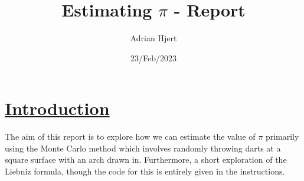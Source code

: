 \documentclass[a4paper,11pt]{article}
\begin{document}
\title{
	\textbf{Estimating $\pi$ - Report}
}
\date{23/Feb/2023}
\author{Adrian Hjert}

\maketitle

\section*{
	\underline{Introduction}
}
The aim of this report is to explore how we can estimate the value of $\pi$ primarily using the Monte Carlo method which involves randomly throwing darts at a square surface with an arch drawn in. Furthermore, a short exploration of the Liebniz formula, though the code for this is entirely given in the instructions.
\end{document}
